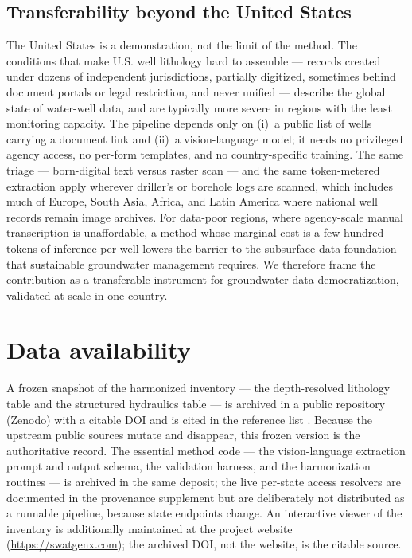 \documentclass[12pt]{article}
\begin{document}
\subsection{Transferability beyond the United States}
The United States is a demonstration, not the limit of the method. The conditions that make U.S. well
lithology hard to assemble --- records created under dozens of independent jurisdictions, partially
digitized, sometimes behind document portals or legal restriction, and never unified --- describe the
global state of water-well data, and are typically more severe in regions with the least monitoring
capacity. The pipeline depends only on (i)~a public list of wells carrying a document link and (ii)~a
vision-language model; it needs no privileged agency access, no per-form templates, and no
country-specific training. The same triage --- born-digital text versus raster scan --- and the same
token-metered extraction apply wherever driller's or borehole logs are scanned, which includes much of
Europe, South Asia, Africa, and Latin America where national well records remain image archives. For
data-poor regions, where agency-scale manual transcription is unaffordable, a method whose marginal cost is
a few hundred tokens of inference per well lowers the barrier to the subsurface-data foundation that
sustainable groundwater management requires. We therefore frame the contribution as a transferable
instrument for groundwater-data democratization, validated at scale in one country.

\section*{Data availability}
A frozen snapshot of the harmonized inventory --- the depth-resolved lithology table and the structured
hydraulics table --- is archived in a public repository (Zenodo) with a citable DOI and is cited in the
reference list \citep{rafiei2026data}. Because the upstream public sources
mutate and disappear, this frozen version is the authoritative record. The essential method code --- the
vision-language extraction prompt and output schema, the validation harness, and the harmonization
routines --- is archived in the same deposit; the live per-state access resolvers are documented in the
provenance supplement but are deliberately not distributed as a runnable pipeline, because state endpoints
change. An interactive viewer of the inventory is additionally maintained at the project website
(\url{https://swatgenx.com}); the archived DOI, not the website, is the citable source.
\end{document}
